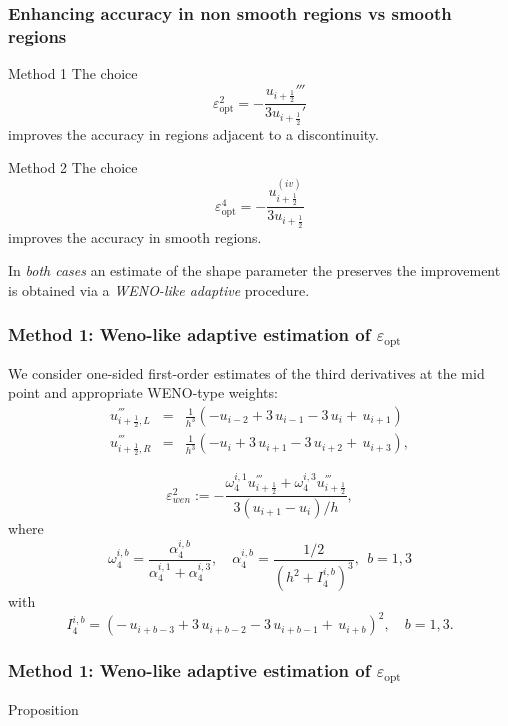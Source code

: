 \documentclass[xcolor=dvipsnames,9pt,mathserif]{beamer}
\newcommand\xunmezzo{x_{i+\frac12}}
\newcommand\uunmezzo{u_{i+\frac12}}
\newcommand{\coll}[1]{\emph{\color{red} #1}}
\begin{document}
     \begin{frame}
     \frametitle{Enhancing accuracy in non smooth regions vs smooth regions  }

\begin{block}{Method 1}
The choice
$$\varepsilon_{\text{opt}}^2 = -\frac{u_{i+\frac12}'''}{3 u_{i+\frac12}'} $$
improves the accuracy in regions adjacent to a discontinuity.
\end{block}
    \begin{block}{Method 2}
The choice
\[ \varepsilon_{\text{opt}}^4 = -\frac{u^{(iv)}_{i+\frac12}}{3u_{i+\frac12}}\]
improves the accuracy in smooth regions.
\end{block}
In \coll{both cases} an estimate of the shape parameter the preserves the improvement is obtained via a \coll{WENO-like adaptive} procedure.
\end{frame}
\begin{frame}
\frametitle{Method 1: Weno-like adaptive estimation of $\varepsilon_{\text{opt}}$  }
 We    consider one-sided first-order estimates
of the third derivatives at the mid point and appropriate WENO-type weights:
\begin{eqnarray*}
{u}^{'''}_{i+\frac12,L}& = &
 \frac{1}{h^3}( -u_{i-2} + 3 \, u_{i-1} -3 \, u_{i} +  \, u_{i+1})\,\,
\\
{u}^{'''}_{i+\frac12,R} &= &
 \frac{1}{h^3}( -u_{i} +3 \, u_{i+1} -3 \, u_{i+2} + \, u_{i+3} ),
\end{eqnarray*}

$${
\varepsilon^2_{wen} := -
\frac{\omega^{i,1}_4 {u}^{'''}_{i+\frac12 }
+ {\omega^{i,3}_4} {u}^{'''}_{i+\frac12 }} {3(u_{i+1}-u_{i})/h}
},
$$
where
$${
\omega_{4}^{i,b}=\frac{\alpha_{4}^{i,b}}{ \alpha^{i,1}_{4}+ \alpha^{i,3}_{4} },
\quad
\alpha_{4}^{i,b}={ \frac{1/2}{(h^2 +I_4^{i,b})^{3}} }, \ \ b=1,3
}
$$
with
$$I_4^{i,b}=
( - \, u_{i+b-3} + 3 \, u_{i+b-2} -3 \, u_{i+b-1} +  \, u_{i+b})^2,\quad b=1,3. $$
\end{frame}
\begin{frame}
\frametitle{Method 1: Weno-like adaptive estimation of $\varepsilon_{\text{opt}}$  }

\begin{block}{Proposition}
\end{block}
     \end{frame}
\end{document}

